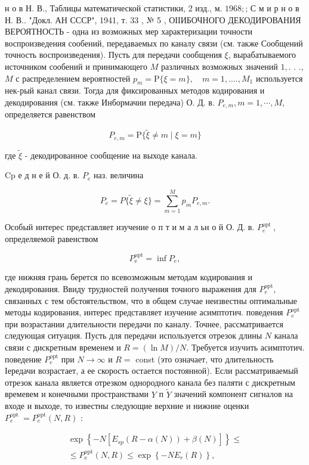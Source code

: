 \documentclass[10pt]{article}
\begin{document}
н о в Н. В., Таблицы математической статистики, 2 изд., м.
$1968 ;$;
С м и р н о в Н. В.. "Докл. АН СССР", 1941, т. 33 , № 5 , ОІІИБОЧНОГО ДЕКОДИРОВАНИЯ ВЕРОЯТНОСТЬ - одна из возможных мер характеризации точности воспроизведения сообений, передаваемых по каналу связи (см. также Сообщений точность воспроизведения). Пусть для передачи сообщения $\xi$, вырабатываемого источником сообений и принимающего $M$ различных возможных значений $1,$. . ., $M$ с распределением вероятностей $p_{m}=\mathrm{P}\{\xi=m\}, \quad m=1, \ldots ., M_{1}$ используется нек-рый канал связи. Тогда для фиксированных методов кодирования и декодирования (см. также Инбормачии передача) О. Д. в. $P_{e, m}, m=1, \cdots, M$, определяется равенством

\[
P_{e, m}=\mathrm{P}\{\tilde{\xi} \neq m \mid \xi=m\}
\]

где $\tilde{\xi}$ - декодированное сообщение на выходе канала.

$\mathrm{C} \mathrm{p}$ е д н е й $О$. д. в. $P_{e}$ наз. величина

\[
P_{e}=P\{\tilde{\xi} \neq \xi\}=\sum_{m=1}^{M} p_{m} P_{e, m} .
\]

Особый интерес представляет изучение о п т и м а л ьн о й О. Д. в. $P_{e}^{\text {opt }}$, определяемой равенством

\[
P_{\mathrm{e}}^{\mathrm{opt}}=\inf P_{e},
\]

где нижняя грань берется по всевозможным методам кодирования и декодирования. Ввиду трудностей получения точного выражения для $P_{e}^{\mathrm{opt}}$, связанных с тем обстоятельством, что в общем случае неизвестны оптимальные методы кодирования, интерес представляет изучение асимптотич. поведения $P_{e}^{\mathrm{opt}}$ при возрастании длительности передачи по каналу. Точнее, рассматривается следующая ситуация. Пусть для передачи используется отрезок длины $N$ канала связи с дискретным временем и $R=(\ln M) / N$. Требуется изучить асимптотич. поведение $P_{e}^{\mathrm{opt}}$ при $N \rightarrow \infty$ и $R=$ const (это означает, что длительность Іередачи возрастает, а ее скорость остается постоянной). Если рассматриваемый отрезок канала является отрезком однородного канала без паляти с дискретным времевем и конечными пространствами $Y$ п $\tilde{Y}$ значений компонент сигналов на входе и выходе, то известны следующие верхние и нижние оценки $P_{e}^{\text {opt }}=P_{e}^{\mathrm{opt}}(N, R)$ :

\[
\begin{gathered}
\exp \left\{-N\left[E_{s p}(R-\alpha(N))+\beta(N)\right]\right\} \leqslant \\
\leqslant P_{\mathrm{e}}^{\mathrm{opt}}(N, R) \leqslant \exp \left\{-N E_{r}(R)\right\},
\end{gathered}
\]
\end{document}
